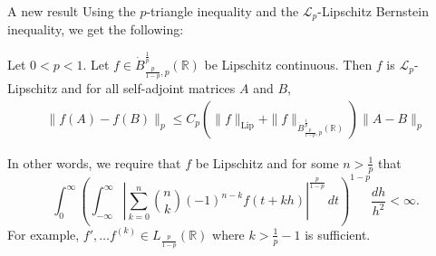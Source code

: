 \documentclass{beamer}
\numberwithin{equation}{section}
\theoremstyle{plain}
\theoremstyle{plain}
\theoremstyle{definition}
\theoremstyle{plain}
\theoremstyle{plain}
\theoremstyle{definition}
\newcommand{\Rl}{\mathbb{R}}
\newcommand{\Lc}{\mathcal{L}}
\begin{document}
\begin{frame}{A new result}
    Using the $p$-triangle inequality and the $\Lc_p$-Lipschitz Bernstein inequality, we get the following:
    \begin{theorem}
        Let $0 < p < 1.$ Let $f \in \dot{B}^{\frac1p}_{\frac{p}{1-p},p}(\Rl)$ be Lipschitz continuous. Then $f$ is $\Lc_p$-Lipschitz and
        for all self-adjoint matrices $A$ and $B$,
        \begin{align*}
            \|f(A)-f(B)\|_p \leq C_{p}(\|f\|_{\mathrm{Lip}}+\|f\|_{\dot{B}^{\frac1p}_{\frac{p}{1-p},p}(\Rl)})\|A-B\|_p
        \end{align*}
    \end{theorem}
    \pause
    In other words, we require that $f$ be Lipschitz and for some $n>\frac1p$ that
    \begin{equation*}
        \int_0^\infty \left(\int_{-\infty}^\infty \left|\sum_{k=0}^n \binom{n}{k}(-1)^{n-k}f(t+kh)\right|^{\frac{p}{1-p}}\,dt\right)^{1-p} \frac{dh}{h^2} < \infty.
    \end{equation*}
    \pause
    For example, $f',\ldots f^{(k)} \in L_{\frac{p}{1-p}}(\Rl)$ where $k > \frac{1}{p}-1$ is sufficient.
\end{frame}
\end{document}
